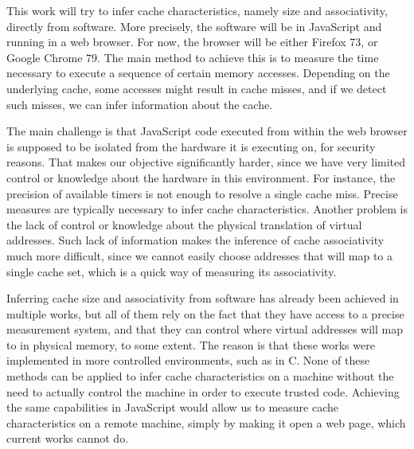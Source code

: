 \documentclass[a4paper,11pt,oneside]{report}
\begin{document}


This work will try to infer cache characteristics, namely size and associativity, directly from software. More precisely, the software will be in JavaScript and running in a web browser. For now, the browser will be either Firefox 73, or Google Chrome 79. The main method to achieve this is to measure the time necessary to execute a sequence of certain memory accesses. Depending on the underlying cache, some accesses might result in cache misses, and if we detect such misses, we can infer information about the cache.


The main challenge is that JavaScript code executed from within the web browser is supposed to be isolated from the hardware it is executing on, for security reasons. That makes our objective significantly harder, since we have very limited control or knowledge about the hardware in this environment. For instance, the precision of available timers is not enough to resolve a single cache miss. Precise measures are typically necessary to infer cache characteristics. Another problem is the lack of control or knowledge about the physical translation of virtual addresses. Such lack of information makes the inference of cache associativity much more difficult, since we cannot easily choose addresses that will map to a single cache set, which is a quick way of measuring its associativity.


Inferring cache size and associativity from software has already been achieved in multiple works, but all of them rely on the fact that they have access to a precise measurement system, and that they can control where virtual addresses will map to in physical memory, to some extent. The reason is that these works were implemented in more controlled environments, such as in C. None of these methods can be applied to infer cache characteristics on a machine without the need to actually control the machine in order to execute trusted code. Achieving the same capabilities in JavaScript would allow us to measure cache characteristics on a remote machine, simply by making it open a web page, which current works cannot do.
\end{document}
